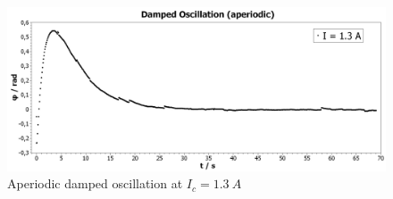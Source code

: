             \begin{figure}
                \centering
                \includegraphics[width=1\linewidth]{"messdaten/Damped Oscillation (aperiodic)"}
                \caption[Aperiodic damped oscillation at \(I_c=\SI{1.3}{A}\)]{Aperiodic damped oscillation at \(I_c=\SI{1.3}{A}\)}
                \label{fig:damped-oscillation-aperiodic}
            \end{figure}
